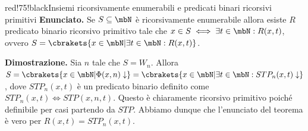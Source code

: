 \begin{halfframedbox}{red!75!black}{Insiemi ricorsivamente enumerabili e predicati binari ricorsivi primitivi}
\textbf{Enunciato. } Se \(S \subseteq \mbN\) è ricorsivamente enumerabile allora esiste \(R\) predicato binario ricorsivo primitivo tale che \(x \in S \iff \exists t \in \mbN : R(x,t)\), ovvero \(S=\cbrakets{x \in \mbN \vert \exists t \in \mbN : R(x,t)}\).
\begin{center}
  \textcolor{red!75!black}{\hdashrule[0.5ex]{18cm}{1pt}{3mm 3pt 1mm 2pt}}
\end{center}
\textbf{Dimostrazione. } Sia \(n\) tale che \(S=W_n\). Allora \(S=\cbrakets{x \in \mbN \vert \Phi(x,n)\downarrow} = \cbrakets{x \in \mbN \vert \exists t \in \mbN: STP_n(x,t)\downarrow}\), dove \(STP_n(x,t)\) è un predicato binario definito come \(STP_n(x,t) \iff STP(x,n,t)\). Questo è chiaramente ricorsivo primitivo poiché definibile per casi partendo da \(STP\). Abbiamo dunque che l'enunciato del teorema è vero per \(R(x,t)=STP_n(x,t)\).
\end{halfframedbox}

